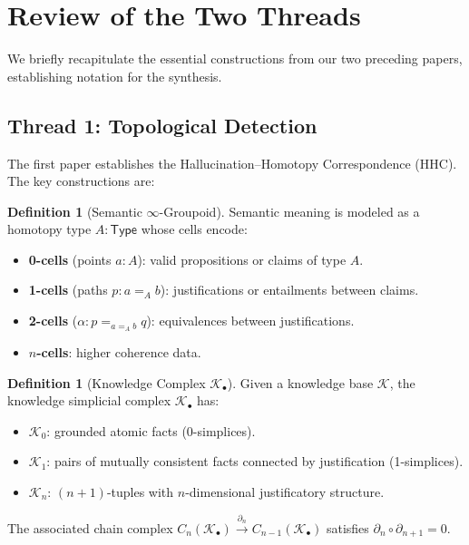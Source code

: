 \documentclass[11pt,a4paper]{article}
\theoremstyle{plain}
\theoremstyle{definition}
\newtheorem{definition}[theorem]{Definition}
\theoremstyle{remark}
\newcommand{\Type}{\mathsf{Type}}
\begin{document}
\section{Review of the Two Threads}\label{sec:review}

We briefly recapitulate the essential constructions from our two preceding papers, establishing notation for the synthesis.

\subsection{Thread 1: Topological Detection}\label{sec:review-detection}

The first paper \cite{long2026hhc} establishes the Hallucination--Homotopy Correspondence (HHC). The key constructions are:

\begin{definition}[Semantic $\infty$-Groupoid]\label{def:semtype-review}
Semantic meaning is modeled as a homotopy type $A : \Type$ whose cells encode:
\begin{itemize}[nosep]
  \item \textbf{0-cells} (points $a : A$): valid propositions or claims of type $A$.
  \item \textbf{1-cells} (paths $p : a =_A b$): justifications or entailments between claims.
  \item \textbf{2-cells} ($\alpha : p =_{a =_A b} q$): equivalences between justifications.
  \item \textbf{$n$-cells}: higher coherence data.
\end{itemize}
\end{definition}

\begin{definition}[Knowledge Complex $\mathcal{K}_\bullet$]\label{def:knowledge-complex-review}
Given a knowledge base $\mathcal{K}$, the knowledge simplicial complex $\mathcal{K}_\bullet$ has:
\begin{itemize}[nosep]
  \item $\mathcal{K}_0$: grounded atomic facts (0-simplices).
  \item $\mathcal{K}_1$: pairs of mutually consistent facts connected by justification (1-simplices).
  \item $\mathcal{K}_n$: $(n{+}1)$-tuples with $n$-dimensional justificatory structure.
\end{itemize}
The associated chain complex $C_n(\mathcal{K}_\bullet) \xrightarrow{\partial_n} C_{n-1}(\mathcal{K}_\bullet)$ satisfies $\partial_n \circ \partial_{n+1} = 0$.
\end{definition}
\end{document}
